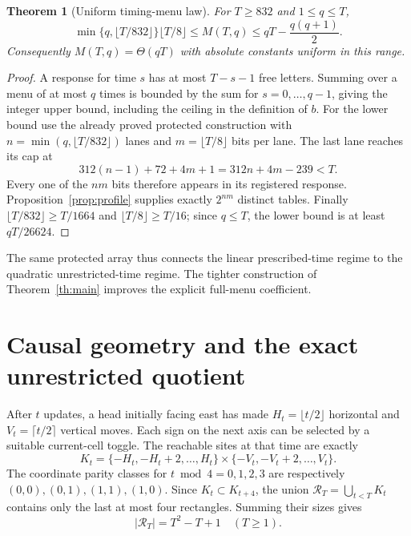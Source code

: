 \documentclass[11pt]{article}
\newtheorem{theorem}{Theorem}
\theoremstyle{definition}\newtheorem{definition}[theorem]{Definition}
\newcommand{\RR}{\mathcal R_T}
\begin{document}
\begin{theorem}[Uniform timing-menu law]\label{th:menu}
For $T\ge832$ and $1\le q\le T$,
\[
 \min\{q,\lfloor T/832\rfloor\}\lfloor T/8\rfloor
 \le M(T,q)\le qT-\frac{q(q+1)}2.
\]
Consequently $M(T,q)=\Theta(qT)$ with absolute constants uniform in this range.
\end{theorem}
\begin{proof}
A response for time $s$ has at most $T-s-1$ free letters. Summing over a menu
of at most $q$ times is bounded by the sum for $s=0,\ldots,q-1$, giving the
integer upper bound, including the ceiling in the definition of $b$.
For the lower bound use the already proved protected construction with
$n=\min(q,\lfloor T/832\rfloor)$ lanes and $m=\lfloor T/8\rfloor$ bits per lane.
The last lane reaches its cap at
\[
 312(n-1)+72+4m+1=312n+4m-239<T.
\]
Every one of the $nm$ bits therefore appears in its registered response.
Proposition~\ref{prop:profile} supplies exactly $2^{nm}$ distinct tables.
Finally $\lfloor T/832\rfloor\ge T/1664$ and $\lfloor T/8\rfloor\ge T/16$;
since $q\le T$, the lower bound is at least $qT/26624$.
\end{proof}

The same protected array thus connects the linear prescribed-time regime to
the quadratic unrestricted-time regime. The tighter construction of
Theorem~\ref{th:main} improves the explicit full-menu coefficient.

\section{Causal geometry and the exact unrestricted quotient}
After $t$ updates, a head initially facing east has made
$H_t=\lfloor t/2\rfloor$ horizontal and $V_t=\lceil t/2\rceil$ vertical moves.
Each sign on the next axis can be selected by a suitable current-cell toggle.
The reachable sites at that time are exactly
\[
K_t=\{-H_t,-H_t+2,\ldots,H_t\}\times
    \{-V_t,-V_t+2,\ldots,V_t\}.
\]
The coordinate parity classes for $t\bmod4=0,1,2,3$ are respectively
$(0,0),(0,1),(1,1),(1,0)$. Since $K_t\subset K_{t+4}$, the union
$\RR=\bigcup_{t<T}K_t$ contains only the last at most four rectangles.
Summing their sizes gives
\begin{equation}\label{eq:cone}
|\RR|=T^2-T+1\quad(T\ge1).
\end{equation}
\end{document}
